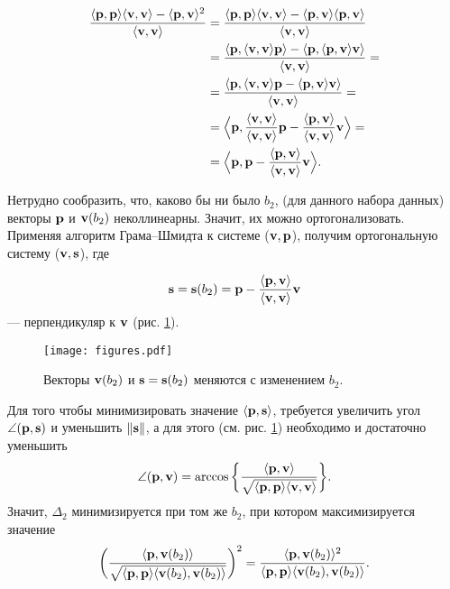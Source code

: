 \[
\begin{split}
\dfrac{\langle \mathbf{p}, \mathbf{p} \rangle\langle \mathbf{v}, \mathbf{v} \rangle - \langle \mathbf{p}, \mathbf{v} \rangle^2}{\langle \mathbf{v}, \mathbf{v} \rangle} & = \dfrac{\langle \mathbf{p}, \mathbf{p} \rangle\langle \mathbf{v}, \mathbf{v} \rangle - \langle \mathbf{p}, \mathbf{v} \rangle \langle \mathbf{p}, \mathbf{v} \rangle}{\langle \mathbf{v}, \mathbf{v} \rangle}\\
& = \dfrac{\langle \mathbf{p}, \langle \mathbf{v}, \mathbf{v} \rangle \mathbf{p} \rangle - \langle \mathbf{p}, \langle \mathbf{p}, \mathbf{v} \rangle \mathbf{v} \rangle}{\langle \mathbf{v}, \mathbf{v} \rangle} =\\
& = \dfrac{\langle \mathbf{p}, \langle \mathbf{v}, \mathbf{v} \rangle \mathbf{p} - \langle \mathbf{p}, \mathbf{v} \rangle \mathbf{v} \rangle}{\langle \mathbf{v}, \mathbf{v} \rangle} =\\
& = \Big \langle \mathbf{p},  \dfrac{\langle \mathbf{v}, \mathbf{v} \rangle}{\langle \mathbf{v}, \mathbf{v} \rangle} \mathbf{p} - \dfrac{\langle \mathbf{p}, \mathbf{v} \rangle}{\langle \mathbf{v}, \mathbf{v} \rangle} \mathbf{v}  \Big \rangle =\\
& = \Big \langle \mathbf{p},  \mathbf{p} - \dfrac{\langle \mathbf{p}, \mathbf{v} \rangle}{\langle \mathbf{v}, \mathbf{v} \rangle} \mathbf{v}  \Big \rangle.
\end{split}
\]

Нетрудно сообразить, что, каково бы ни было $b_2$, (для данного набора данных) векторы $\mathbf{p}$ и $\mathbf{v}(b_2)$ неколлинеарны. Значит, их можно ортогонализовать. Применяя алгоритм Грама--Шмидта к системе ($\mathbf{v}, \mathbf{p}$), получим ортогональную систему ($\mathbf{v}, \mathbf{s}$), где 

\[
\mathbf{s} = \mathbf{s}(b_2) = \mathbf{p} - \dfrac{\langle \mathbf{p}, \mathbf{v} \rangle}{\langle \mathbf{v}, \mathbf{v} \rangle} \mathbf{v}
\]
--- перпендикуляр к $\mathbf{v}$ (рис. \ref{fig:fig-1}).

\begin{figure}[h]
\centering
\texttt{[image: figures.pdf]}
\caption{Векторы $\mathbf{v}(b_2)$ и $\mathbf{s}=\mathbf{s}(b_2)$ меняются  с изменением $b_2$.}
\label{fig:fig-1}
\end{figure}

Для того чтобы минимизировать значение $\langle \mathbf{p}, \mathbf{s} \rangle$, требуется увеличить угол $\angle (\mathbf{p}, \mathbf{s})$ и уменьшить $\lVert \mathbf{s}\rVert$, а для этого (см. рис. \ref{fig:fig-1}) необходимо и достаточно уменьшить
\[
\angle (\mathbf{p}, \mathbf{v}) = \arccos \bigg\{ \dfrac{\langle \mathbf{p}, \mathbf{v} \rangle}{ \sqrt{\langle \mathbf{p}, \mathbf{p} \rangle\langle \mathbf{v}, \mathbf{v} \rangle} } \bigg\}.
\]
Значит, $\Delta _2$ минимизируется при том же $b_2$, при котором максимизируется значение
\[
\bigg( \dfrac{\langle \mathbf{p}, \mathbf{v}(b_2) \rangle}{ \sqrt{\langle \mathbf{p}, \mathbf{p} \rangle\langle \mathbf{v}(b_2), \mathbf{v}(b_2) \rangle} } \bigg)^2 =  \dfrac{\langle \mathbf{p}, \mathbf{v}(b_2) \rangle^2}{ \langle \mathbf{p}, \mathbf{p} \rangle\langle \mathbf{v}(b_2), \mathbf{v}(b_2) \rangle }.
\]

